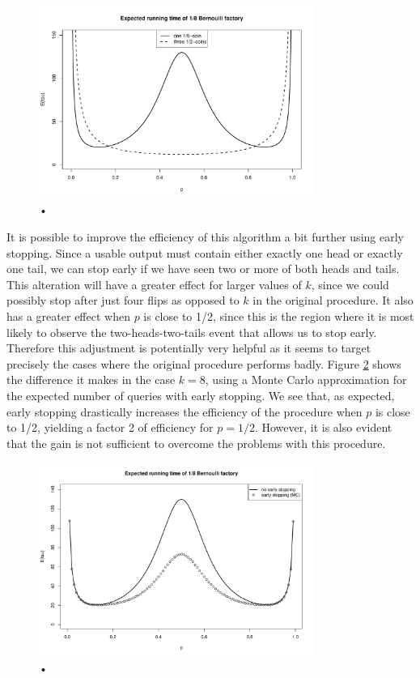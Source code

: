 \documentclass{article}
\theoremstyle{definition}
\begin{document}
\begin{figure}
\centering
\includegraphics[width=0.8\textwidth]{const8_runtime.pdf}
\caption{•}
\label{fig:runtime_const8}
\end{figure}

It is possible to improve the efficiency of this algorithm a bit further using early stopping. Since a usable output must contain either exactly one head or exactly one tail, we can stop early if we have seen two or more of both heads and tails.  This alteration will have a greater effect for larger values of $k$, since we could possibly stop after just four flips as opposed to $k$ in the original procedure. It also has a greater effect when $p$ is close to 1/2, since this is the region where it is most likely to observe the two-heads-two-tails event that allows us to stop early. Therefore this adjustment is potentially very helpful as it seems to target precisely the cases where the original procedure performs badly. Figure \ref{fig:runtime_const8_earlystop} shows the difference it makes in the case $k=8$, using a Monte Carlo approximation for the expected number of queries with early stopping. We see that, as expected, early stopping drastically increases the efficiency of the procedure when $p$ is close to 1/2, yielding a factor 2 of efficiency for $p=1/2$. However, it is also evident that the gain is not sufficient to overcome the problems with this procedure.

\begin{figure}
\centering
\includegraphics[width=0.8\textwidth]{const_runtime_earlystop.pdf}
\caption{•}
\label{fig:runtime_const8_earlystop}
\end{figure}
\end{document}
